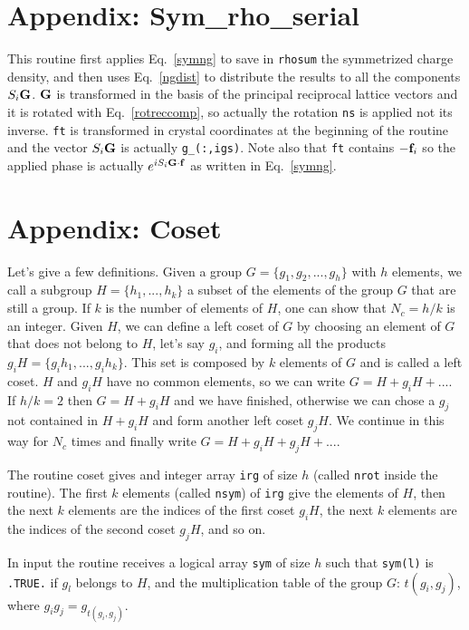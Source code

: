 \documentclass[12pt,a4paper,twoside]{report}
\begin{document}
\section{Appendix: Sym\_rho\_serial}

This routine first applies Eq.~\ref{symng} to save in \texttt{rhosum} the symmetrized charge density, and then uses Eq.~\ref{ngdist} to distribute the results to all the components
$S_i {\bf G}$. ${\bf G}$ is transformed in the basis of the principal reciprocal lattice 
vectors and it is rotated with Eq.~\ref{rotreccomp}, so actually the rotation
\texttt{ns} is applied not its inverse. \texttt{ft} is transformed in crystal coordinates at the beginning of the routine and the vector $S_i {\bf G}$ is actually \texttt{g\_(:,igs)}. Note also that \texttt{ft} contains $-{\bf f}_i$ so the
applied phase is actually $e^{iS_i{\bf G}\cdot {\bf f}}$ as written in Eq.~\ref{symng}.

\section{Appendix: Coset}

Let's give a few definitions. Given a group $G=\{g_1,g_2,...,g_h\}$ with 
$h$ elements, we call a subgroup $H=\{h_1,...,h_k\}$ a subset of the 
elements of the group $G$ that are still a group. If $k$ is the number 
of elements of $H$, one can show that $N_c=h/k$ is an integer. 
Given $H$, we can define a left coset of $G$ by choosing an element 
of $G$ that does not belong to $H$, let's say $g_i$, and forming all the
products $g_i H = \{ g_i h_1,..., g_i h_k\}$. This set is composed by
$k$ elements of $G$ and is called a left coset. 
$H$ and $g_i H$ have no common elements, so we can write
$G=H + g_i H + ...$. If $h/k=2$ then $G=H+g_i H$ and we have finished, 
otherwise we can chose a $g_j$ not contained in $H+g_i H$ and form 
another left coset $g_j H$. We continue in this way for $N_c$ times
and finally write $G=H+g_i H + g_j H +...$. 

The routine coset gives and integer array \texttt{irg} of size $h$ (called
\texttt{nrot} inside the routine). The first $k$ elements (called 
\texttt{nsym}) of \texttt{irg} give the elements of $H$, then the next
$k$ elements are the indices of the first coset $g_i H$, the next
$k$ elements are the indices of the second coset $g_j H$, and so on.

In input the routine receives a logical array \texttt{sym} of size $h$ 
such that \texttt{sym(l)} is \texttt{.TRUE.} if $g_l$
belongs to $H$, and the multiplication table of
the group $G$: $t(g_i,g_j)$, where $g_i g_j = g_{t(g_i,g_j)}$.
\end{document}
